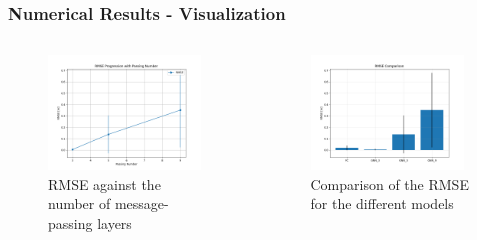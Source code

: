 \documentclass{beamer}
\begin{document}
\begin{frame}
    \frametitle{Numerical Results - Visualization}
    \begin{columns}
        \begin{figure}
            \centering
            \includegraphics[width=0.95\textwidth]{Images/metrics_plots/10k/rmse_line_plot.png}
            \caption{RMSE against the number of message-passing layers}
            \end{figure}
        \begin{figure}
            \centering
            \includegraphics[width=0.95\textwidth]{Images/metrics_plots/10k/rmse_histogram.png}
            \caption{Comparison of the RMSE for the different models}
        \end{figure}
    \end{columns}
\end{frame}
\end{document}
